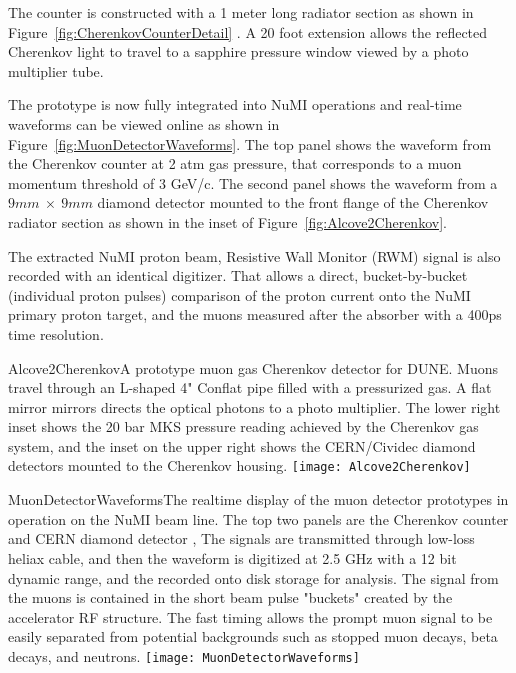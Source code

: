 The counter is constructed with a 1 meter long radiator section
as shown in Figure~\ref{fig:CherenkovCounterDetail} . A 20 foot extension allows the reflected 
Cherenkov light to travel to a sapphire pressure window viewed by a photo multiplier tube.

The prototype is now fully integrated into NuMI operations and real-time waveforms can be viewed online as shown in Figure~\ref{fig:MuonDetectorWaveforms}. The top panel shows the waveform from the Cherenkov counter at 2 atm gas pressure, that corresponds to a muon momentum threshold of 3 GeV/c. The second panel shows the waveform from a $9mm\ \times\ 9mm$ diamond detector mounted to the front flange of the Cherenkov radiator section as shown in the inset 
of Figure~\ref{fig:Alcove2Cherenkov}.

The extracted NuMI proton beam, Resistive Wall Monitor (RWM) signal 
is also recorded with an identical digitizer. That allows a direct, bucket-by-bucket (individual proton pulses) 
comparison of the proton current onto the NuMI primary proton target, and the muons measured after the absorber with a 400ps time resolution.

\begin{cdrfigure}{Alcove2Cherenkov}{A prototype muon gas Cherenkov detector for DUNE.  
Muons travel through an L-shaped 4" Conflat pipe filled with a pressurized gas. A flat mirror mirrors directs the optical photons to a photo multiplier. The lower right inset shows the 20 bar MKS pressure reading achieved by the Cherenkov gas system, and the inset on the upper right shows the CERN/Cividec diamond detectors mounted to the Cherenkov housing.}
\texttt{[image: Alcove2Cherenkov]}
\end{cdrfigure}

\begin{cdrfigure}{MuonDetectorWaveforms}{The realtime display of the
muon detector prototypes in operation on the NuMI beam line. The top two panels are the Cherenkov counter and CERN diamond detector \cite{ref:CERNdiamond}, The signals are transmitted through low-loss heliax cable, and then the waveform is digitized at 2.5 GHz with a 12 bit dynamic range, and the recorded onto disk storage for analysis. The signal from the muons is contained in the short beam pulse "buckets" created by the accelerator RF structure. The fast timing allows the prompt muon signal to be easily separated from potential backgrounds such as stopped muon decays, beta decays, and neutrons.}
\texttt{[image: MuonDetectorWaveforms]}
\end{cdrfigure}

